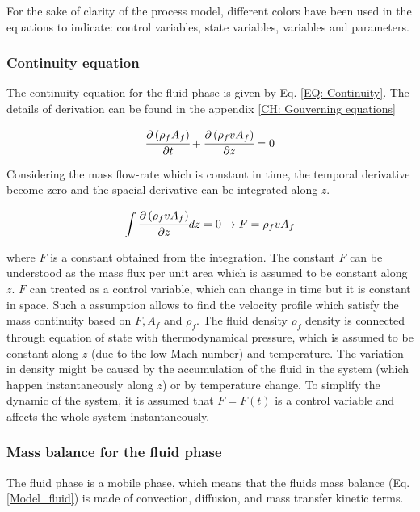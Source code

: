 \documentclass[../Article_Model_Parameters.tex]{subfiles}
\begin{document}
	For the sake of clarity of the process model, different colors have been used in the equations to indicate: 
	{\color{red}control variables},
	{\color{blue}state variables},
	{\color{orange}variables} and
	{\color{magenta}parameters}.
	
	\subsubsection{Continuity equation} \label{CH: Continuity}
	The continuity equation for the fluid phase is given by Eq. \ref{EQ: Continuity}. The details of derivation can be found in the appendix \ref{CH: Gouverning equations}
	
	{\footnotesize
		\begin{equation}
			\cfrac{\partial \left( \rho_f A_f \right)}{\partial t} + \cfrac{\partial \left( \rho_f v A_f \right)}{\partial z} = 0
			\label{EQ: Continuity}
		\end{equation}
	}
	
	Considering the mass flow-rate which is constant in time, the temporal derivative become zero and the spacial derivative can be integrated along $z$.
	
	{\footnotesize
		\begin{equation*}
			\int \cfrac{\partial \left( \rho_f v A_f \right)}{\partial z} dz = 0 \rightarrow F=\rho_f v A_f
		\end{equation*}
	}

	where $F$ is a constant obtained from the integration. The constant $F$ can be understood as the mass flux per unit area which is assumed to be constant along $z$. $F$ can treated as a control variable, which can change in time but it is constant in space. Such a assumption allows to find the velocity profile which satisfy the mass continuity based on $F, A_f$ and $\rho_f$. The fluid density $\rho_f$ density is connected through equation of state with thermodynamical pressure, which is assumed to be constant along $z$ (due to the low-Mach number) and temperature. The variation in density might be caused by the accumulation of the fluid in the system (which happen instantaneously along $z$) or by temperature change. To simplify the dynamic of the system, it is assumed that $F=F(t)$ is a control variable and affects the whole system instantaneously.
	
	\subsubsection{Mass balance for the fluid phase} \label{CH: Mass_balance_fluid}
	The fluid phase is a mobile phase, which means that the fluids mass balance (Eq. \ref{Model_fluid}) is made of convection, diffusion, and mass transfer kinetic terms.
	
\end{document}

